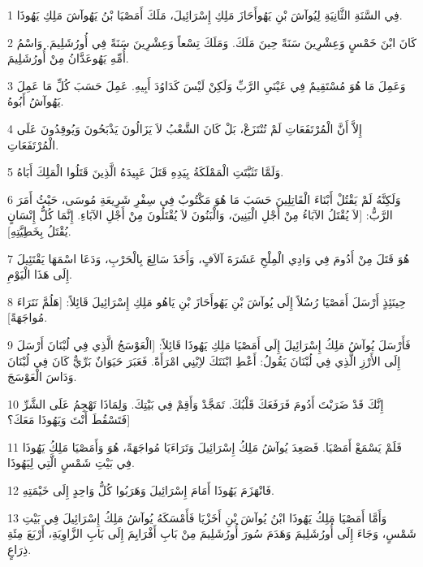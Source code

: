\par 1 فِي السَّنَةِ الثَّانِيَةِ لِيُوآشَ بْنِ يَهُوأَحَازَ مَلِكِ إِسْرَائِيلَ، مَلَكَ أَمَصْيَا بْنُ يَهُوآشَ مَلِكِ يَهُوذَا.
\par 2 كَانَ ابْنَ خَمْسٍ وَعِشْرِينَ سَنَةً حِينَ مَلَكَ. وَمَلَكَ تِسْعاً وَعِشْرِينَ سَنَةً فِي أُورُشَلِيمَ. وَاسْمُ أُمِّهِ يَهُوعَدَّانُ مِنْ أُورُشَلِيمَ.
\par 3 وَعَمِلَ مَا هُوَ مُسْتَقِيمٌ فِي عَيْنَيِ الرَّبِّ وَلَكِنْ لَيْسَ كَدَاوُدَ أَبِيهِ. عَمِلَ حَسَبَ كُلِّ مَا عَمِلَ يَهُوآشُ أَبُوهُ.
\par 4 إِلاَّ أَنَّ الْمُرْتَفَعَاتِ لَمْ تُنْتَزَعْ، بَلْ كَانَ الشَّعْبُ لاَ يَزَالُونَ يَذْبَحُونَ وَيُوقِدُونَ عَلَى الْمُرْتَفَعَاتِ.
\par 5 وَلَمَّا تَثَبَّتَتِ الْمَمْلَكَةُ بِيَدِهِ قَتَلَ عَبِيدَهُ الَّذِينَ قَتَلُوا الْمَلِكَ أَبَاهُ.
\par 6 وَلَكِنَّهُ لَمْ يَقْتُلْ أَبْنَاءَ الْقَاتِلِينَ حَسَبَ مَا هُوَ مَكْتُوبٌ فِي سِفْرِ شَرِيعَةِ مُوسَى، حَيْثُ أَمَرَ الرَّبُّ: [لاَ يُقْتَلُ الآبَاءُ مِنْ أَجْلِ الْبَنِينَ، وَالْبَنُونَ لاَ يُقْتَلُونَ مِنْ أَجْلِ الآبَاءِ. إِنَّمَا كُلُّ إِنْسَانٍ يُقْتَلُ بِخَطِيَّتِهِ].
\par 7 هُوَ قَتَلَ مِنْ أَدُومَ فِي وَادِي الْمِلْحِ عَشَرَةَ آلاَفٍ، وَأَخَذَ سَالِعَ بِالْحَرْبِ، وَدَعَا اسْمَهَا يَقْتَئِيلَ إِلَى هَذَا الْيَوْمِ.
\par 8 حِينَئِذٍ أَرْسَلَ أَمَصْيَا رُسُلاً إِلَى يُوآشَ بْنِ يَهُوأَحَازَ بْنِ يَاهُو مَلِكِ إِسْرَائِيلَ قَائِلاً: [هَلُمَّ نَتَرَاءَ مُواجَهَةً].
\par 9 فَأَرْسَلَ يُوآشُ مَلِكُ إِسْرَائِيلَ إِلَى أَمَصْيَا مَلِكِ يَهُوذَا قَائِلاً: [الْعَوْسَجُ الَّذِي فِي لُبْنَانَ أَرْسَلَ إِلَى الأَرْزِ الَّذِي فِي لُبْنَانَ يَقُولُ: أَعْطِ ابْنَتَكَ لاِبْنِي امْرَأَةً. فَعَبَرَ حَيَوَانٌ بَرِّيٌّ كَانَ فِي لُبْنَانَ وَدَاسَ الْعَوْسَجَ.
\par 10 إِنَّكَ قَدْ ضَرَبْتَ أَدُومَ فَرَفَعَكَ قَلْبُكَ. تَمَجَّدْ وَأَقِمْ فِي بَيْتِكَ. وَلِمَاذَا تَهْجِمُ عَلَى الشَّرِّ فَتَسْقُطَ أَنْتَ وَيَهُوذَا مَعَكَ؟]
\par 11 فَلَمْ يَسْمَعْ أَمَصْيَا. فَصَعِدَ يُوآشُ مَلِكُ إِسْرَائِيلَ وَتَرَاءَيَا مُواجَهَةً، هُوَ وَأَمَصْيَا مَلِكُ يَهُوذَا فِي بَيْتِ شَمْسٍ الَّتِي لِيَهُوذَا.
\par 12 فَانْهَزَمَ يَهُوذَا أَمَامَ إِسْرَائِيلَ وَهَرَبُوا كُلُّ وَاحِدٍ إِلَى خَيْمَتِهِ.
\par 13 وَأَمَّا أَمَصْيَا مَلِكُ يَهُوذَا ابْنُ يُوآشَ بْنِ أَخَزْيَا فَأَمْسَكَهُ يُوآشُ مَلِكُ إِسْرَائِيلَ فِي بَيْتِ شَمْسٍ، وَجَاءَ إِلَى أُورُشَلِيمَ وَهَدَمَ سُورَ أُورُشَلِيمَ مِنْ بَابِ أَفْرَايِمَ إِلَى بَابِ الزَّاوِيَةِ، أَرْبَعَ مِئَةِ ذِرَاعٍ.
